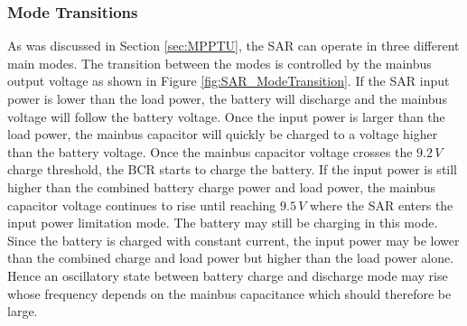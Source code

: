 \subsubsection{Mode Transitions}
%
As was discussed in Section \ref{sec:MPPTU}, the \ac{SAR} can operate in three different main modes. The transition between the modes is controlled by the mainbus output voltage as shown in Figure \ref{fig:SAR_ModeTransition}. If the \ac{SAR} input power is lower than the load power, the battery will discharge and the mainbus voltage will follow the battery voltage. Once the input power is larger than the load power, the mainbus capacitor will quickly be charged to a voltage higher than the battery voltage. Once the mainbus capacitor voltage crosses the $9.2\,V$ charge threshold, the \ac{BCR} starts to charge the battery. If the input power is still higher than the combined battery charge power and load power, the mainbus capacitor voltage continues to rise until reaching $9.5\,V$ where the \ac{SAR} enters the input power limitation mode. The battery may still be charging in this mode. Since the battery is charged with constant current, the input power may be lower than the combined charge and load power but higher than the load power alone. Hence an oscillatory state between battery charge and discharge mode may rise whose frequency depends on the mainbus capacitance which should therefore be large. 

